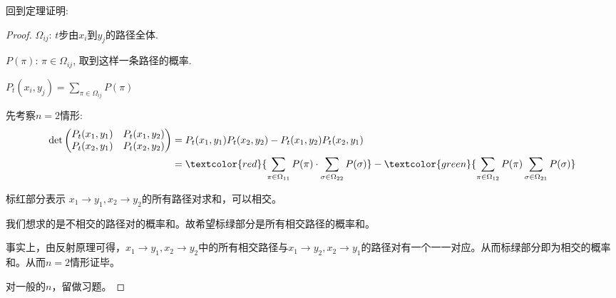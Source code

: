 回到定理证明:
\begin{proof}
$\Omega_{ij}$: $t$步由$x_i$到$y_j$的路径全体.

$P(\pi)$: $\pi\in\Omega_{ij}$, 取到这样一条路径的概率.

$P_{t}(x_{i},y_{j})=\sum\limits_{\pi\in\Omega_{ij}} P(\pi)$

先考察$n=2$情形:
\begin{equation*}
    \begin{aligned}
        \det \begin{pmatrix} P_t(x_1, y_1) & P_t(x_1, y_2) \\ P_t(x_2, y_1) & P_t(x_2, y_2) \end{pmatrix}&=P_{t}(x_1,y_1)P_{t}(x_2,y_2) - P_{t}(x_1,y_2)P_{t}(x_2,y_1)\\
        &=\textcolor{red}{\sum_{\pi\in\Omega_{11}} P(\pi) \cdot \sum_{\sigma\in\Omega_{22}} P(\sigma)} - \textcolor{green}{\sum_{\pi\in\Omega_{12}} P(\pi) \sum_{\sigma\in\Omega_{21}} P(\sigma)}
    \end{aligned}
\end{equation*}

标红部分表示 $x_1 \rightarrow y_1,
x_2 \rightarrow y_2$的所有路径对求和，可以相交。

我们想求的是不相交的路径对的概率和。故希望标绿部分是所有相交路径的概率和。

事实上，由反射原理可得，$x_1 \rightarrow y_1,
x_2 \rightarrow y_2$中的所有相交路径与$x_1 \rightarrow y_2,
x_2 \rightarrow y_1$的路径对有一个一一对应。从而标绿部分即为相交的概率和。从而$n=2$情形证毕。

对一般的$n$，留做习题。
 
\end{proof}

